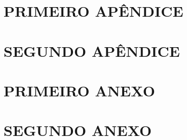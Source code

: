 \postextual

\begin{apendicesenv}
\partapendices

\chapter{PRIMEIRO APÊNDICE}

\lipsum[50]

\chapter{SEGUNDO APÊNDICE}

\lipsum[50]

\end{apendicesenv}

\begin{anexosenv}
\partanexos

\chapter{PRIMEIRO ANEXO}

\lipsum[30]

\chapter{SEGUNDO ANEXO}

\lipsum[30]

\end{anexosenv}

\printindex
